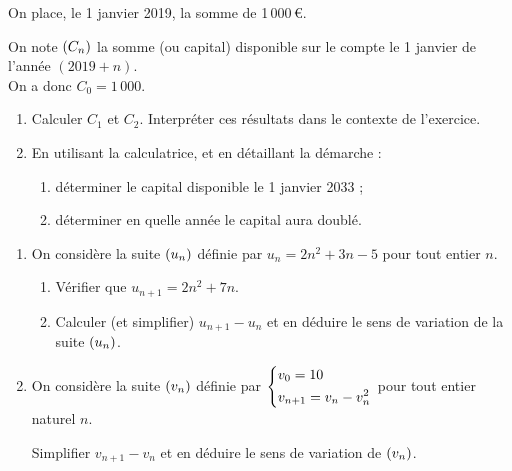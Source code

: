 \documentclass[a4paper,11pt]{article}
\begin{document}
\smallskip

On place, le 1 janvier 2019, la somme de 1\,000\,€.

On note $\suiten[C]$ la somme (ou capital) disponible sur le compte le 1 janvier de l'année $(2019+n)$.\\ On a donc $C_0=1\,000$.

\begin{enumerate}
	\item Calculer $C_1$ et $C_2$. Interpréter ces résultats dans le contexte de l'exercice.
	\item En utilisant la calculatrice, et en détaillant la démarche :
	\begin{enumerate}
		\item déterminer le capital disponible le 1 janvier 2033 ;
		\item déterminer en quelle année le capital aura doublé.
	\end{enumerate}
\end{enumerate}

\bigskip


\begin{enumerate}
	\item On considère la suite $\suiten$ définie par $u_n=2n^2+3n-5$ pour tout entier $n$.
	\begin{enumerate}
		\item Vérifier que $u_{n+1}=2n^2+7n$.
		\item Calculer (et simplifier) $u_{n+1}-u_n$ et en déduire le sens de variation de la suite $\suiten$.
	\end{enumerate}
	\item On considère la suite $\suiten[v]$ définie par $\begin{dcases} v_0=10 \\ v_{n+1}=v_n-v_n^2 \end{dcases}$ pour tout entier naturel $n$.
	
	Simplifier $v_{n+1}-v_n$ et en déduire le sens de variation de $\suiten[v]$.
\end{enumerate}
\end{document}
